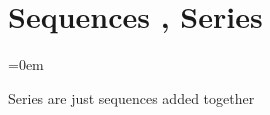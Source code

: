 
\section{Sequences , Series}
\label{sec:sequences_series}
\parindent=0em


Series are just sequences added together


\sectionend
